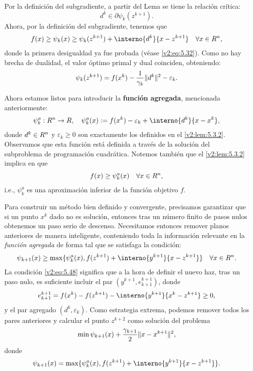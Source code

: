 Por la definición del subgradiente, a partir del Lema se tiene la relación crítica:
\begin{equation}
    d^k \in \partial \psi_k(z^{k+1}).
    \label{v2:eq:5.43}
\end{equation}
Ahora, por la definición del subgradiente, tenemos que
\begin{equation}
    f(x) \ge \psi_k(x) \ge \psi_k(z^{k+1}) + \interno{d^k}{x - z^{k+1}} \quad \forall x \in \Rn,
    \label{v2:eq:5.44}
\end{equation}
donde la primera desigualdad ya fue probada (véase \eqref{v2:eq:5.32}). Como no hay brecha de dualidad, el valor óptimo primal y dual coinciden, obteniendo:
\begin{equation}
    \psi_k(z^{k+1}) = f(x^k) - \frac{1}{\gamma_k} \lVert d^k\rVert^2 - \varepsilon_k.
    \label{v2:eq:5.45}
\end{equation}

Ahora estamos listos para introducir la \textbf{función agregada}, mencionada anteriormente:
\begin{equation}
    \psi_k^a : \Rn \to \R, \quad \psi_k^a(x) := f(x^k) - \varepsilon_k + \interno{d^k}{x - x^k},
    \label{v2:eq:5.46}
\end{equation}
donde $d^k \in R^n$ y $\varepsilon_k \ge 0$ son exactamente los definidos en el \cref{v2:lem:5.3.2}. Observamos que esta función está definida a través de la solución del subproblema de programación cuadrática. Notemos también que el \cref{v2:lem:5.3.2} implica en que
\begin{equation}
    f(x) \ge \psi_k^a(x) \quad \forall x \in R^n,
    \label{v2:eq:5.47}
\end{equation}
i.e., $\psi_k^a$ es una aproximación inferior de la función objetivo $f$.

Para construir un método bien definido y convergente, precisamos garantizar que si un punto $x^k$ dado no es solución, entonces tras un número finito de pasos nulos obtenemos un paso serio de descenso. Necesitamos entonces remover planos anteriores de manera inteligente, conteniendo toda la información relevante en la \textit{función agregada} de forma tal que se satisfaga la condición:
\begin{equation}
    \psi_{k+1}(x) \ge \max \{ \psi_k^a(x), f(z^{k+1}) + \interno{y^{k+1}}{x - z^{k+1}} \} \quad \forall x \in \Rn.
    \label{v2:eq:5.48}
\end{equation}
La condición \eqref{v2:eq:5.48} significa que a la hora de definir el nuevo haz, tras un paso nulo, es suficiente incluir el par $(y^{k+1}, e_{k+1}^{k+1})$, donde
\begin{equation}
    e_{k+1}^{k+1} = f(x^k) - f(z^{k+1}) - \interno{y^{k+1}}{x^k - z^{k+1}} \ge 0,
    \label{v2:eq:5.49}
\end{equation}
y el par agregado $(d^k, \varepsilon_k)$. Como estrategia extrema, podemos remover todos los pares anteriores y calcular el punto $z^{k+2}$ como solución del problema 
\[
    \min \psi_{k+1}(x) + \frac{\gamma_{k+1}}{2} \lVert x - x^{k+1}\rVert^2,
\]
donde
\begin{equation}
    \psi_{k+1}(x) = \max \{ \psi_k^a(x), f(z^{k+1}) + \interno{y^{k+1}}{x - z^{k+1}} \}.
    \label{v2:eq:5.50}
\end{equation}

